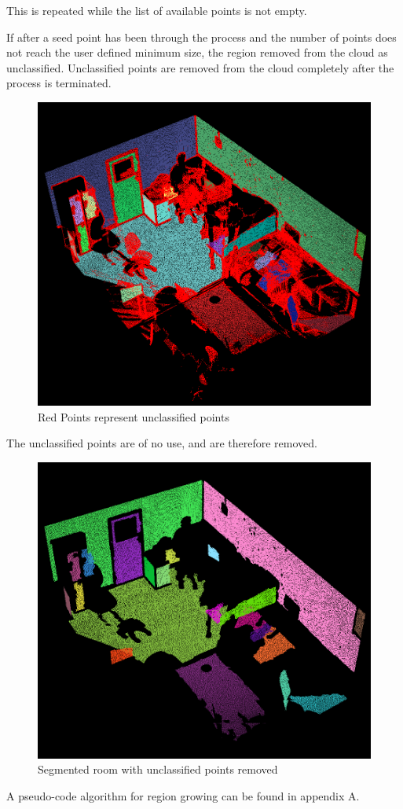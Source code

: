 		This is repeated while the list of available points is not empty.
		
		If after a seed point has been through the process and the number of points does not reach the user defined minimum size, the region removed from the cloud as unclassified. Unclassified points are removed from the cloud completely after the process is terminated.
		
		\begin{figure}[H]
			\centering
			\includegraphics[width=0.6\linewidth]{Includes/images/GrownRegions}
			\caption{Red Points represent unclassified points}
			\label{fig:GrownRegions}
		\end{figure}
		
		The unclassified points are of no use, and are therefore removed.
		
		
		\begin{figure}[H]
			\centering
			\includegraphics[width=0.6\linewidth]{Includes/images/RG-noUnclass}
			\caption{Segmented room with unclassified points removed}
			\label{fig:RG-noUnclass}
		\end{figure}
		
		A pseudo-code algorithm for region growing can be found in appendix A.
		
